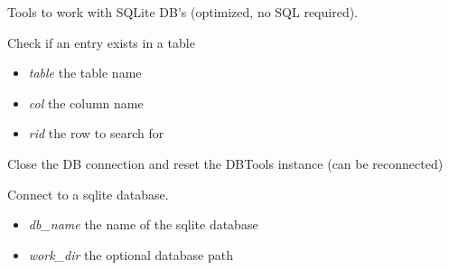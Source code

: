\documentclass[a4paper,11pt,english]{sphinxmanual}
\begin{document}
\begin{fulllineitems}
\label{modules_doc:cbmpy.CBNetDB.DBTools}
Tools to work with SQLite DB's (optimized, no SQL required).

\begin{fulllineitems}
\label{modules_doc:cbmpy.CBNetDB.DBTools.checkEntryInColumn}
Check if an entry exists in a table
\begin{itemize}
\item {} 
\emph{table} the table name

\item {} 
\emph{col} the column name

\item {} 
\emph{rid} the row to search for

\end{itemize}

\end{fulllineitems}


\begin{fulllineitems}
\label{modules_doc:cbmpy.CBNetDB.DBTools.closeDB}
Close the DB connection and reset the DBTools instance (can be reconnected)

\end{fulllineitems}


\begin{fulllineitems}
\label{modules_doc:cbmpy.CBNetDB.DBTools.connectSQLiteDB}
Connect to a sqlite database.
\begin{itemize}
\item {} 
\emph{db\_name} the name of the sqlite database

\item {} 
\emph{work\_dir} the optional database path

\end{itemize}

\end{fulllineitems}


\end{fulllineitems}
\end{document}
